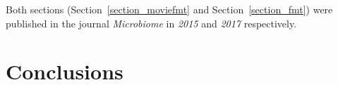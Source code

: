 \documentclass[12pt,chapterheads]{ucsd}
\begin{document}
Both sections (Section~\ref{section_moviefmt} and Section~\ref{section_fmt}) 
were published in the journal \textsl{Microbiome} in \textsl{2015} and 
\textsl{2017} respectively.

\ifdefined\RELEASE
    
    
\fi

\chapter{Conclusions}






\printindex %


\end{document}
